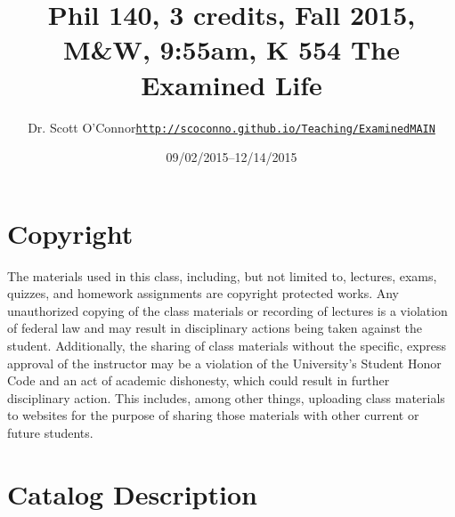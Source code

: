 \documentclass[11pt,article,oneside]{memoir}
\def\myauthor{Author}
\def\mytitle{Title}
\def\mycopyright{\myauthor}
\def\myweb{\href{http://scoconno.github.io/Teaching/ExaminedMAIN}{http://scoconno.github.io/Teaching/ExaminedMAIN}}
\def\myauthor{Dr. Scott O'Connor}
\def\mytitle{{\normalsize Phil 140, 3 credits, Fall 2015, M\&W, 9:55am, K 554\newline} \HUGE The Examined Life}
\begin{document}
\setsansfont[Mapping=tex-text]{Georgia} 
\setmonofont[Mapping=tex-text,Scale=0.8]{Georgia} 

\def\ind{\hangindent=1 true cm\hangafter=1 \noindent}
\def\labelitemi{$\cdot$}

\pagestyle{kjh}

\title{\LARGE \mytitle}     
\author{\Large\myauthor \newline \footnotesize\texttt{\noindent\myweb}}
\date{09/02/2015--12/14/2015}

\published{\,}

\maketitle




%
%

\section{Copyright}
The materials used in this class, including, but not limited to, lectures, exams, quizzes, and homework assignments are copyright protected works.  Any unauthorized copying of the class materials or recording of lectures is a violation of federal law and may result in disciplinary actions being taken against the student.  Additionally, the sharing of class materials without the specific, express approval of the instructor may be a violation of the University's Student Honor Code and an act of academic dishonesty, which could result in further disciplinary action.  This includes, among other things, uploading class materials to websites for the purpose of sharing those materials with other current or future students. 

\section{Catalog Description}
\end{document}
